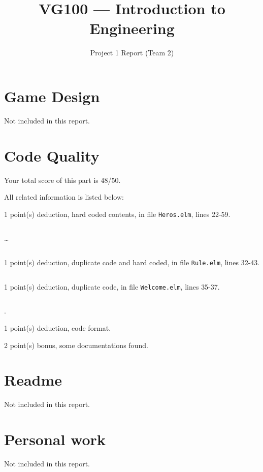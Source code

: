 \documentclass{article}
\title{VG100 --- Introduction to\\ Engineering}
\subtitle{Project 1 Report (Team 2)}
\begin{document}
\maketitle

\section{Game Design}

Not included in this report.

\section{Code Quality}

Your total score of this part is 48/50. \medskip

All related information is listed below: \medskip

1 point(s) {\color{red}deduction}, hard coded contents, in file {\color{blue}\texttt{Heros.elm}}, lines {\color{blue}22-59}.

\inputminted[firstline=22,lastline=31]{elm}{Heros.elm}

\dots

\inputminted[firstline=50,lastline=59]{elm}{Heros.elm}

1 point(s) {\color{red}deduction}, duplicate code and hard coded, in file {\color{blue}\texttt{Rule.elm}}, lines {\color{blue}32-43}.

\inputminted[firstline=32,lastline=43]{elm}{Rule.elm}

1 point(s) {\color{red}deduction}, duplicate code, in file {\color{blue}\texttt{Welcome.elm}}, lines {\color{blue}35-37}.

\inputminted[firstline=35,lastline=37]{elm}{Welcome.elm}

.\medskip

1 point(s) {\color{red}deduction}, code format.\medskip

2 point(s) {\color{red}bonus}, some documentations found.\medskip



\newpage

\section{Readme}

Not included in this report.

\section{Personal work}

Not included in this report.


\newpage
\end{document}
